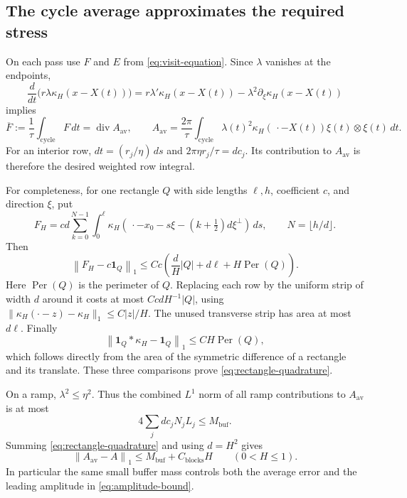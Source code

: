 \documentclass[11pt,a4paper,reqno]{amsart}
\theoremstyle{plain}
\theoremstyle{definition}
\theoremstyle{remark}
\numberwithin{equation}{section}
\newcommand{\Div}{\operatorname{div}}
\newcommand{\norm}[2]{\left\|#1\right\|_{#2}}
\newcommand{\ind}{\mathbf 1}
\begin{document}
\subsection{The cycle average approximates the required stress}

On each pass use $F$ and $E$ from
\eqref{eq:visit-equation}. Since $\lambda$ vanishes at the endpoints,
\[
 \frac d{dt}\bigl(r\lambda \kappa_H(x-X(t))\bigr)
 =r\lambda'\kappa_H(x-X(t))
                    -\lambda^2\partial_\xi \kappa_H(x-X(t))
\]
implies
\begin{equation}\label{eq:cycle-average}
 \overline F:=\frac1\tau\int_{\mathrm{cycle}}F\,dt
       =\Div A_{\mathrm{av}},\qquad
 A_{\mathrm{av}}=\frac{2\pi}{\tau}\int_{\mathrm{cycle}}
        \lambda(t)^2\kappa_H(\,\cdot-X(t))\xi(t)\otimes\xi(t)\,dt.
\end{equation}
For an interior row, $dt=(r_j/\eta)\,ds$ and
$2\pi\eta r_j/\tau=dc_j$. Its contribution to
$A_{\mathrm{av}}$ is therefore the desired weighted row integral.

For completeness, for one rectangle $Q$ with side lengths $\ell,h$,
coefficient $c$, and direction $\xi$, put
\[
 F_H=cd\sum_{k=0}^{N-1}\int_0^\ell
 \kappa_H(\,\cdot-x_0-s\xi-(k+\tfrac12)d\xi^\perp)\,ds,
 \qquad N=\lfloor h/d\rfloor.
\]
Then
\begin{equation}\label{eq:rectangle-quadrature}
 \norm{F_H-c\ind_Q}1
 \le Cc\left(\frac dH|Q|+d\ell+H\operatorname{Per}(Q)\right).
\end{equation}
Here $\operatorname{Per}(Q)$ is the perimeter of $Q$. Replacing
each row by the uniform strip of width $d$ around it
costs at most $CcdH^{-1}|Q|$, using
$\|\kappa_H(\cdot-z)-\kappa_H\|_1\le C|z|/H$. The unused transverse strip
has area at most $d\ell$. Finally
\[
 \norm{\ind_Q*\kappa_H-\ind_Q}1
 \le CH\operatorname{Per}(Q),
\]
which follows directly from the area of the symmetric difference of a
rectangle and its translate. These three comparisons prove
\eqref{eq:rectangle-quadrature}.

On a ramp, $\lambda^2\le\eta^2$. Thus the combined $L^1$ norm of
all ramp contributions to $A_{\mathrm{av}}$ is at most
\[
 4\sum_j dc_jN_jL_j
 \le M_{\mathrm{buf}}.
\]
Summing \eqref{eq:rectangle-quadrature} and using $d=H^2$ gives
\begin{equation}\label{eq:average-approximation}
 \norm{A_{\mathrm{av}}-A}1
 \le M_{\mathrm{buf}}+C_{\mathrm{blocks}}H
 \qquad(0<H\le1).
\end{equation}
In particular the same small buffer mass controls both the average
error and the leading amplitude in \eqref{eq:amplitude-bound}.
\end{document}
